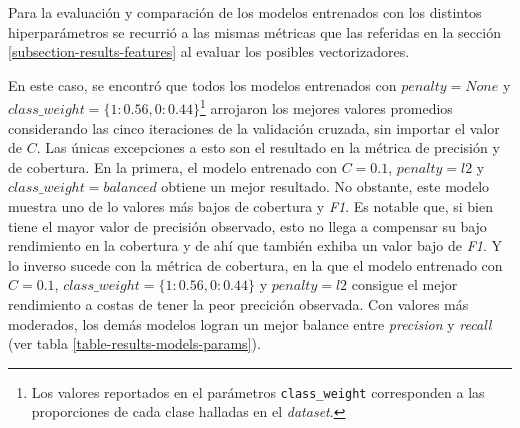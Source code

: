 Para la evaluaci\'on y comparaci\'on de los modelos entrenados con los
distintos hiperpar\'ametros se recurri\'o a las mismas m\'etricas que las
referidas en la secci\'on \ref{subsection-results-features} al evaluar
los posibles vectorizadores.
\par
En este caso, se encontr\'o que todos los modelos
entrenados con $penalty=None$ y
$class\_weight=\lbrace1:0.56,0:0.44\rbrace$\footnote{Los valores
reportados en el par\'ametros \texttt{class\_weight} corresponden a
las proporciones de cada clase halladas en el \textit{dataset}.}
arrojaron los mejores valores promedios considerando las cinco iteraciones
de la validaci\'on cruzada, sin importar el valor de $C$.
Las \'unicas excepciones a esto son el resultado en la
m\'etrica de precisi\'on y de cobertura. En la primera, el modelo entrenado con
$C=0.1$, $penalty=l2$ y $class\_weight=balanced$
obtiene un mejor resultado. No obstante, este modelo muestra uno de lo valores
m\'as bajos de cobertura y \textit{F1}. Es notable que, si bien tiene el mayor
valor de precisi\'on observado, esto no llega a compensar su bajo rendimiento
en la cobertura y de ah\'i que tambi\'en exhiba un valor bajo de \textit{F1}.
Y lo inverso sucede con la m\'etrica de cobertura, en la que el modelo
entrenado con $C=0.1$, $class\_weight=\lbrace1:0.56,0:0.44\rbrace$ y
$penalty=l2$ consigue el mejor rendimiento a costas de tener la peor precici\'on
observada.
Con valores m\'as moderados, los dem\'as modelos logran un mejor balance entre
\textit{precision} y \textit{recall} (ver tabla \ref{table-results-models-params}).

